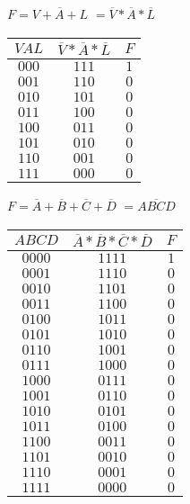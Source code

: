 \documentclass[12pt,largemargins]{homework}
\begin{document}
\begin{alphaparts}
\item
$F=\overline{V+A+L}$
$=\overline{V}*\overline{A}*\overline{L}$\\
\begin{tabular}{|c|c|c|}
\hline
$VAL$ & $\overline{V}*\overline{A}*\overline{L}$ & $F$\\
\hline
$000$ & $111$ & $ 1 $ \\
$001$ & $110$ & $ 0 $ \\
$010$ & $101$ & $ 0 $ \\
$011$ & $100$ & $ 0 $ \\
$100$ & $011$ & $ 0 $ \\
$101$ & $010$ & $ 0 $ \\
$110$ & $001$ & $ 0 $ \\
$111$ & $000$ & $ 0 $ \\
\hline
\end{tabular}
\item
$F=\overline{A}+\overline{B}+\overline{C}+\overline{D}$
$=\overline{ABCD}$\\
\begin{tabular}{|c|c|c|}
\hline
$ABCD$ & $\overline{A}*\overline{B}*\overline{C}*\overline{D}$ & $F$\\
\hline
$0000$ & $1111$ & $ 1 $ \\
$0001$ & $1110$ & $ 0 $ \\
$0010$ & $1101$ & $ 0 $ \\
$0011$ & $1100$ & $ 0 $ \\
$0100$ & $1011$ & $ 0 $ \\
$0101$ & $1010$ & $ 0 $ \\
$0110$ & $1001$ & $ 0 $ \\
$0111$ & $1000$ & $ 0 $ \\
$1000$ & $0111$ & $ 0 $ \\
$1001$ & $0110$ & $ 0 $ \\
$1010$ & $0101$ & $ 0 $ \\
$1011$ & $0100$ & $ 0 $ \\
$1100$ & $0011$ & $ 0 $ \\
$1101$ & $0010$ & $ 0 $ \\
$1110$ & $0001$ & $ 0 $ \\
$1111$ & $0000$ & $ 0 $ \\

\hline
\end{tabular}
\end{alphaparts}
\end{document}
